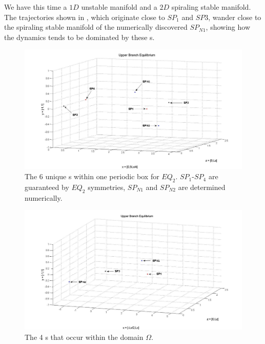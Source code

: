 \documentclass[letter,12pt,openany]{article}
\begin{document}
We have this time a $1D$ unstable manifold and a $2D$ spiraling stable 
manifold. The trajectories shown in , which 
originate close to $SP_1$ and $SP3$, wander close to the spiraling stable 
manifold of the numerically discovered $SP_{N1}$, showing how the 
dynamics tends to be dominated by these {\stagp}s. 

 \begin{figure}[!h]
\includegraphics[width=1.0\textwidth]{stagps_edited.jpg}
  \caption{
   The 6 unique \stagp s within one periodic box for $EQ_2$. 
   $SP_1$-$SP_4$ are guaranteed by $EQ_2$ symmetries, $SP_{N1}$ and 
   $SP_{N2}$ are determined numerically. 
   }
  \label{fig:stagps_label}
 \end{figure}

 \begin{figure}[!h]
\includegraphics[width=1.0\textwidth]{stagps2_edited.jpg}
  \caption{
   The 4 \stagp s that occur within the domain $\Omega$.
   }
  \label{fig:stagps_label2}
 \end{figure}
\end{document}
